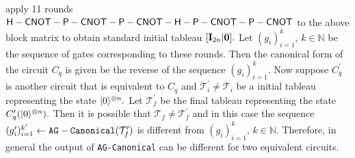 apply 11 rounds  ${\sf H}-{\sf CNOT}-{\sf P}-{\sf CNOT}-{\sf P}-{\sf CNOT}-{\sf H}-{\sf P}-{\sf CNOT}-{\sf P}-{\sf CNOT}$ to the above block matrix to obtain standard initial tableau $[{\bf I}_{2n}|{\bf 0}].$ Let $(g_i)_{i=1}^k,\, k\in\mathbb{N}$ be the sequence of gates corresponding to these rounds. Then the canonical form of the circuit $C_q$ is given be the reverse of the sequence $(g_i)_{i=1}^k.$ Now suppose $C_q^\prime$  is another circuit that is equivalent to
$C_q$ and $\mathcal{T}_i^\prime \neq \mathcal{T}_i$ be a initial tableau representing the state ${\lvert}0\rangle^{\otimes n}.$ Let $\mathcal{T}_f^\prime$ be the final tableau representing the state $C_q^\prime({\lvert}0\rangle^{\otimes n}).$ Then it is possible that $\mathcal{T}_f\neq \mathcal{T}_f^\prime$ and in this case the sequence $(g_i^\prime )_{i=1}^{k^\prime} \leftarrow {\tt AG-Canonical}(\mathcal{T}_f^\prime)$ is different from $(g_i)_{i=1}^k,\, k\in\mathbb{N}.$ Therefore, in general the output of {\tt AG-Canonical}  can be different for two equivalent circuits.

